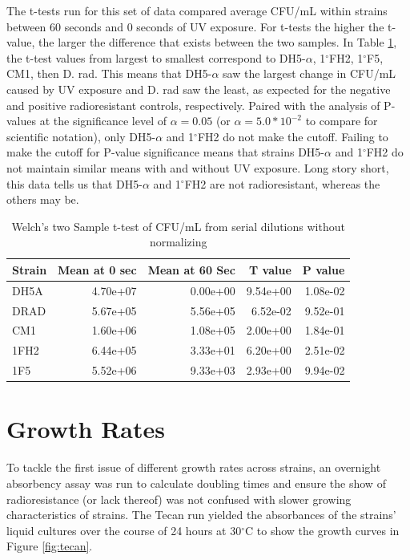 \documentclass[12pt,twoside]{reedthesis}
\begin{document}
The t-tests run for this set of data compared average CFU/mL within strains between 60 seconds and 0 seconds of UV exposure. For t-tests the higher the t-value, the larger the difference that exists between the two samples. In Table \ref{tab:ttests1}, the t-test values from largest to smallest correspond to DH5-\(\alpha\), 1\(^\circ\)FH2, 1\(^\circ\)F5, CM1, then D. rad. This means that DH5-\(\alpha\) saw the largest change in CFU/mL caused by UV exposure and D. rad saw the least, as expected for the negative and positive radioresistant controls, respectively. Paired with the analysis of P-values at the significance level of \(\alpha = 0.05\) (or \(\alpha = 5.0*10^{-2}\) to compare for scientific notation), only DH5-\(\alpha\) and 1\(^\circ\)FH2 do not make the cutoff. Failing to make the cutoff for P-value significance means that strains DH5-\(\alpha\) and 1\(^\circ\)FH2 do not maintain similar means with and without UV exposure. Long story short, this data tells us that DH5-\(\alpha\) and 1\(^\circ\)FH2 are not radioresistant, whereas the others may be.
\begin{longtable}[t]{lrrrr}
\caption[T-Tests Non-normalized]{\label{tab:ttests1} Welch’s two Sample t-test of CFU/mL from serial dilutions without normalizing}\\
\toprule
Strain & Mean at 0 sec & Mean at 60 Sec & T value & P value\\
\midrule
DH5A & 4.70e+07 & 0.00e+00 & 9.54e+00 & 1.08e-02\\
DRAD & 5.67e+05 & 5.56e+05 & 6.52e-02 & 9.52e-01\\
CM1 & 1.60e+06 & 1.08e+05 & 2.00e+00 & 1.84e-01\\
1FH2 & 6.44e+05 & 3.33e+01 & 6.20e+00 & 2.51e-02\\
1F5 & 5.52e+06 & 9.33e+03 & 2.93e+00 & 9.94e-02\\
\bottomrule
\end{longtable}
\hypertarget{growth-rates}{%
\section{Growth Rates}\label{growth-rates}}

To tackle the first issue of different growth rates across strains, an overnight absorbency assay was run to calculate doubling times and ensure the show of radioresistance (or lack thereof) was not confused with slower growing characteristics of strains. The Tecan run yielded the absorbances of the strains' liquid cultures over the course of 24 hours at 30\(^\circ\)C to show the growth curves in Figure \ref{fig:tecan}.
\end{document}
